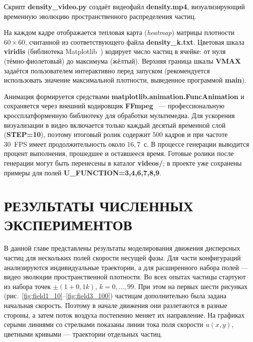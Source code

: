 \documentclass[14pt,a4paper]{extarticle}
\numberwithin{figure}{section}
\numberwithin{table}{section}
\begin{document}
Скрипт \textbf{density\_video.py} создаёт видеофайл \textbf{density.mp4},
визуализирующий временную эволюцию пространственного распределения частиц.

На каждом кадре отображается тепловая карта (\textit{heatmap})
матрицы плотности $60 \times 60$, считанной из соответствующего файла
\textbf{density\_k.txt}. Цветовая шкала \textbf{viridis} (библиотека
Matplotlib~\cite{Matplotlib}) кодирует число частиц в ячейке: от нуля
(тёмно-фиолетовый) до максимума (жёлтый). Верхняя граница шкалы
\textbf{VMAX} задаётся пользователем интерактивно перед запуском
(рекомендуется использовать значение максимальной плотности,
выведенное программой \textbf{main}).

Анимация формируется средствами \linebreak \textbf{matplotlib.animation.FuncAnimation}
и сохраняется через внешний кодировщик \textbf{FFmpeg}~\cite{FFmpeg}
--- профессиональную кроссплатформенную библиотеку для обработки
мультимедиа. Для ускорения визуализации в видео включается только каждый
десятый временной слой (\textbf{STEP=10}), поэтому итоговый ролик содержит
$500$ кадров и при частоте 30~FPS имеет продолжительность около $16{,}7$~с.
В процессе генерации выводится процент выполнения, прошедшее
и оставшееся время. Готовые ролики после генерации могут быть перенесены
в каталог \textbf{videos/}; в проекте уже сохранены примеры для полей
\textbf{U\_FUNCTION=3,4,6,7,8,9}.


\newpage
\section{РЕЗУЛЬТАТЫ ЧИСЛЕННЫХ ЭКСПЕРИМЕНТОВ}

В данной главе представлены результаты моделирования движения дисперсных частиц
для нескольких полей скорости несущей фазы. Для части конфигураций анализируются
индивидуальные траектории, а для расширенного набора полей --- видео эволюции
пространственной плотности. Во всех опытах частицы стартуют из набора точек
$\pm(1+0{,}1k)$, $k=0,\dots,99$. При этом на первых шести рисунках
(рис.~\ref{fig:field1_10}--\ref{fig:field3_100}) частицам дополнительно была задана
начальная скорость. Поэтому в начале движения они разлетаются в разные
стороны, а затем поток воздуха постепенно меняет их направление.
На графиках серыми линиями со стрелками показаны линии тока поля скорости $u(x,y)$,
цветными кривыми --- траектории отдельных частиц.
\end{document}
